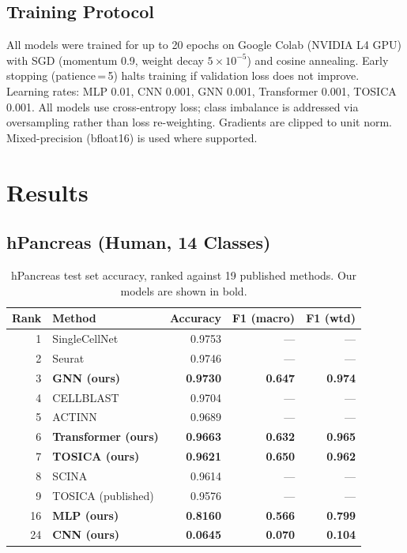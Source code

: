 \documentclass[11pt,letterpaper]{article}
\begin{document}
\subsection{Training Protocol}
All models were trained for up to 20 epochs on Google Colab (NVIDIA L4 GPU)
with SGD (momentum 0.9, weight decay $5{\times}10^{-5}$) and cosine annealing.
Early stopping (patience\,=\,5) halts training if validation loss does not
improve. Learning rates: MLP 0.01, CNN 0.001, GNN 0.001, Transformer 0.001,
TOSICA 0.001. All models use cross-entropy loss; class imbalance is addressed
via oversampling rather than loss re-weighting. Gradients are clipped to unit
norm. Mixed-precision (bfloat16) is used where supported.

\section{Results}

\subsection{hPancreas (Human, 14 Classes)}

\begin{table}[H]
\centering
\caption{hPancreas test set accuracy, ranked against 19 published methods.
Our models are shown in bold.}
\label{tab:hpan}
\begin{tabular}{@{}rlrrr@{}}
\toprule
Rank & Method & Accuracy & F1 (macro) & F1 (wtd) \\
\midrule
1  & SingleCellNet          & 0.9753 & --- & --- \\
2  & Seurat                 & 0.9746 & --- & --- \\
3  & \textbf{GNN (ours)}    & \textbf{0.9730} & \textbf{0.647} & \textbf{0.974} \\
4  & CELLBLAST              & 0.9704 & --- & --- \\
5  & ACTINN                 & 0.9689 & --- & --- \\
6  & \textbf{Transformer (ours)} & \textbf{0.9663} & \textbf{0.632} & \textbf{0.965} \\
7  & \textbf{TOSICA (ours)} & \textbf{0.9621} & \textbf{0.650} & \textbf{0.962} \\
8  & SCINA                  & 0.9614 & --- & --- \\
9  & TOSICA (published)     & 0.9576 & --- & --- \\
16 & \textbf{MLP (ours)}    & \textbf{0.8160} & \textbf{0.566} & \textbf{0.799} \\
24 & \textbf{CNN (ours)}    & \textbf{0.0645} & \textbf{0.070} & \textbf{0.104} \\
\bottomrule
\end{tabular}
\end{table}
\end{document}
